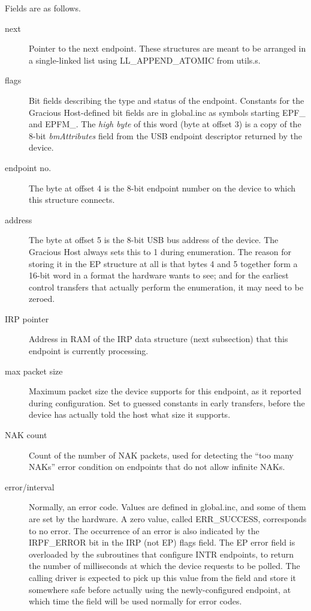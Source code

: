 Fields are as follows.

\begin{description}
  \item[next]  Pointer to the next endpoint.  These structures are meant to
    be arranged in a single-linked list using LL\_APPEND\_ATOMIC from
    utils.s.

  \item[flags]  Bit fields describing the type and status of the endpoint. 
    Constants for the Gracious Host-defined bit fields are in global.inc as
    symbols starting EPF\_ and EPFM\_.  The \emph{high byte} of this word
    (byte at offset 3) is a copy of the 8-bit \emph{bmAttributes} field from
    the USB endpoint descriptor returned by the device.

  \item[endpoint no.]  The byte at offset 4 is the 8-bit endpoint number on
    the device to which this structure connects.

  \item[address]  The byte at offset 5 is the 8-bit USB bus address of the
    device.  The Gracious Host always sets this to 1 during enumeration. 
    The reason for storing it in the EP structure at all is that bytes 4 and
    5 together form a 16-bit word in a format the hardware wants to see; and
    for the earliest control transfers that actually perform the
    enumeration, it may need to be zeroed.

  \item[IRP pointer]  Address in RAM of the IRP data structure (next
    subsection) that this endpoint is currently processing.

  \item[max packet size]  Maximum packet size the device supports for this
    endpoint, as it reported during configuration.  Set to guessed constants
    in early transfers, before the device has actually told the host what
    size it supports.

  \item[NAK count]  Count of the number of NAK packets, used for detecting
    the ``too many NAKs'' error condition on endpoints that do not allow
    infinite NAKs.

  \item[error/interval]  Normally, an error code.  Values are defined in
    global.inc, and some of them are set by the hardware.  A zero value,
    called ERR\_SUCCESS, corresponds to no error.  The occurrence of an error
    is also indicated by the IRPF\_ERROR bit in the IRP (not EP) flags
    field.  The EP error field is
    overloaded by the subroutines that configure INTR endpoints, to return
    the number of milliseconds at which the device requests to be polled. 
    The calling driver is expected to pick up this value from the field
    and store it somewhere safe before actually using the newly-configured
    endpoint, at which time the field will be used normally for error
    codes.
\end{description}

